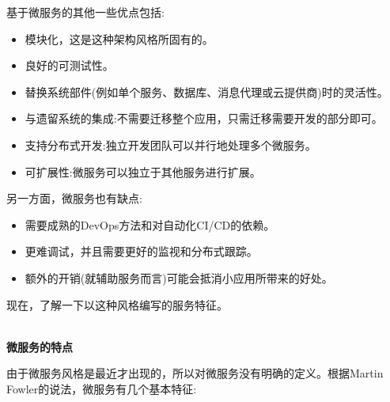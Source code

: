 基于微服务的其他一些优点包括:

\begin{itemize}
\item
模块化，这是这种架构风格所固有的。

\item
良好的可测试性。

\item
替换系统部件(例如单个服务、数据库、消息代理或云提供商)时的灵活性。

\item
与遗留系统的集成:不需要迁移整个应用，只需迁移需要开发的部分即可。

\item
支持分布式开发:独立开发团队可以并行地处理多个微服务。

\item
可扩展性:微服务可以独立于其他服务进行扩展。
\end{itemize}

另一方面，微服务也有缺点:

\begin{itemize}
\item	
需要成熟的DevOps方法和对自动化CI/CD的依赖。

\item
更难调试，并且需要更好的监视和分布式跟踪。

\item
额外的开销(就辅助服务而言)可能会抵消小应用所带来的好处。

\end{itemize}

现在，了解一下以这种风格编写的服务特征。

\hspace*{\fill} \\ %
\noindent
\textbf{微服务的特点}

由于微服务风格是最近才出现的，所以对微服务没有明确的定义。根据Martin Fowler的说法，微服务有几个基本特征:

